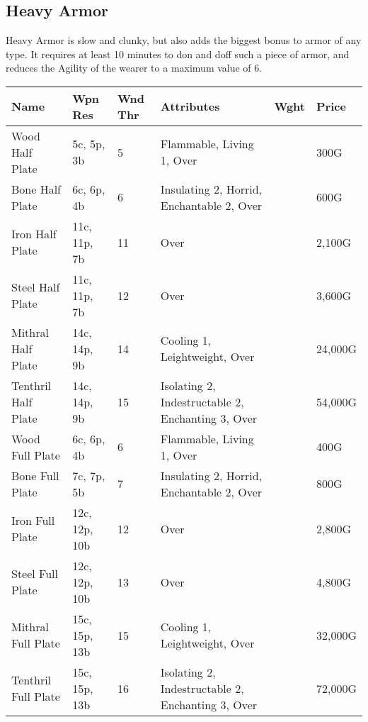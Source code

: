 \subsection{Heavy Armor}

Heavy Armor is slow and clunky, but also adds the biggest bonus to armor of any type. It requires at least 10 minutes to don and doff such a piece of armor, and reduces the Agility of the wearer to a maximum value of 6.

\begin{longtable}{p{3cm} | p{1.5cm} | p{1cm} | p{4cm} | p{1cm} | p{1.5cm}}
	Name & Wpn Res & Wnd Thr &  Attributes & Wght & Price\\ \hline
	Wood Half Plate  & 5c, 5p, 3b & 5 & Flammable, Living 1, Over &  & 300G\\
	
	Bone Half Plate  & 6c, 6p, 4b & 6 & Insulating 2, Horrid, Enchantable 2, Over &  & 600G\\
	
	Iron Half Plate  & 11c, 11p, 7b & 11 & Over &  & 2,100G\\
	
	Steel Half Plate  & 11c, 11p, 7b & 12 & Over &  & 3,600G\\
	
	Mithral Half Plate  & 14c, 14p, 9b & 14 & Cooling 1, Leightweight, Over &  & 24,000G\\
	
	Tenthril Half Plate  & 14c, 14p, 9b & 15 & Isolating 2, Indestructable 2, Enchanting 3, Over &  & 54,000G\\
	
	Wood Full Plate  & 6c, 6p, 4b & 6 & Flammable, Living 1, Over &  & 400G\\
	
	Bone Full Plate  & 7c, 7p, 5b & 7 & Insulating 2, Horrid, Enchantable 2, Over &  & 800G\\
	
	Iron Full Plate  & 12c, 12p, 10b & 12 & Over &  & 2,800G\\
	
	Steel Full Plate  & 12c, 12p, 10b & 13 & Over &  & 4,800G\\
	
	Mithral Full Plate  & 15c, 15p, 13b & 15 & Cooling 1, Leightweight, Over &  & 32,000G\\
	
	Tenthril Full Plate  & 15c, 15p, 13b & 16 & Isolating 2, Indestructable 2, Enchanting 3, Over &  & 72,000G\\
\end{longtable}